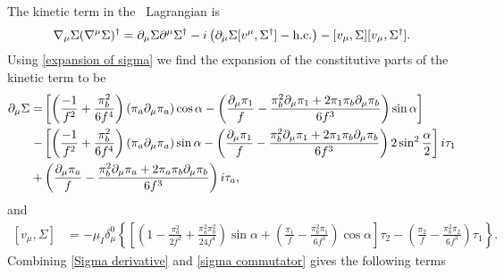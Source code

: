 The kinetic term in the \chpt\, Lagrangian is
\begin{equation}
    \nabla_\mu \Sigma (\nabla^\mu \Sigma)^\dagger 
    = \partial_\mu \Sigma \partial^\mu \Sigma^\dagger 
    - i \left(\partial_\mu \Sigma [v^\mu, \Sigma^\dagger] - \text{h.c.} \right)
    - [v_\mu,\Sigma][v_\mu, \Sigma^\dagger].
    \label{kinetic term}
\end{equation}
%
Using \autoref{expansion of sigma} we find the expansion of the constitutive parts of the kinetic term to be
\begin{align}
    \notag
    \partial_\mu \Sigma 
    = &
    \left[
        \left(
            \frac{-1}{f^2}
            + \frac{\pi_b^2}{6f^4}
        \right)
        (\pi_a \partial_\mu \pi_a)
        \cos{\alpha}
        - 
        \left(
            \frac{\partial_\mu \pi_1}{f} 
            - \frac{\pi_b^2 \partial_\mu\pi_1
            + 2 \pi_1 \pi_b \partial_\mu\pi_b}{6f^3} 
        \right)
        \sin{\alpha}
    \right]
    \\ \notag 
    - &
    \left[
        \left(
            \frac{-1}{f^2}
            + \frac{\pi_b^2}{6f^4}
        \right)
        (\pi_a \partial_\mu \pi_a)
        \sin{\alpha}
        - \left(
        \frac{\partial_\mu \pi_1}{f} 
        - \frac{\pi_b^2 \partial_\mu\pi_1
        + 2 \pi_1 \pi_b \partial_\mu\pi_b}{6f^3}
        \right)
        2 \sin^2{\frac{\alpha}{2}}
    \right]
    i \tau_1 \\ \label{Sigma derivative}
    +& 
    \left(
        \frac{\partial_\mu \pi_a}{f} 
        - \frac{\pi_b^2 \partial_\mu\pi_a 
        + 2 \pi_a \pi_b \partial_\mu\pi_b}{6f^3} 
    \right)
    i \tau_a,
\end{align}
%
and
\begin{align}
    [v_\mu,\Sigma]
    & =
    -\mu_I \delta^0_\mu
    \left\{
        \left[
        \left(
            1 
            - \frac{\pi_a^2}{2f^2}
            + \frac{\pi_a^2\pi_b^2}{24f^4}
        \right)
        \sin{\alpha}
        + 
        \left(
            \frac{\pi_1}{f} 
            - \frac{\pi_b^2\pi_1}{6f^3} 
        \right) \cos{\alpha}
        \right]
         \tau_2
        -
        \left(
            \frac{\pi_2}{f} 
            - \frac{\pi_b^2\pi_2}{6f^3} 
        \right)
        \tau_1
    \right\}.
    \label{sigma commutator}
\end{align}
%
Combining \autoref{Sigma derivative} and \autoref{sigma commutator} gives the following terms
